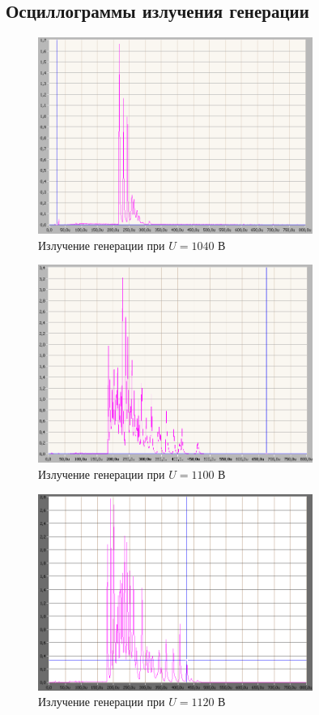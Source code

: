 \documentclass[a4paper,14pt]{extarticle}
\begin{document}
\subsection{Осциллограммы излучения генерации}
\begin{figure}[H]
  \centering
  \includegraphics[width=0.8\textwidth]{png/1040Binv.png}
  \caption{Излучение генерации при $U=1040$ В}
  \label{fig:figure1}
\end{figure}
\begin{figure}[H]
  \centering
  \includegraphics[width=0.8\textwidth]{png/1100Binv.png}
  \caption{Излучение генерации при $U=1100$ В}
  \label{fig:figure1}
\end{figure}
\begin{figure}[H]
  \centering
  \includegraphics[width=0.8\textwidth]{png/1120Binv.png}
  \caption{Излучение генерации при $U=1120$ В}
  \label{fig:figure1}
\end{figure}
\end{document}
